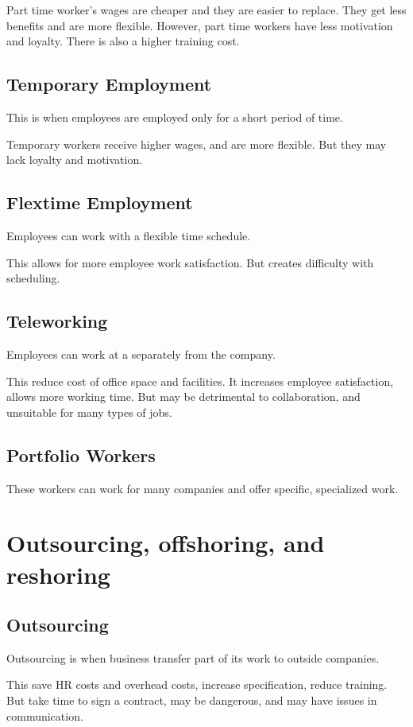 \documentclass{report}
\begin{document}
Part time worker's wages are cheaper and they are easier to replace.
They get less benefits and are more flexible.
However, part time workers have less motivation and loyalty.
There is also a higher training cost.

\subsection{Temporary Employment}
This is when employees are employed only for a short period of time.

Temporary workers receive higher wages, and are more flexible.
But they may lack loyalty and motivation.

\subsection{Flextime Employment}
Employees can work with a flexible time schedule.

This allows for more employee work satisfaction.
But creates difficulty with scheduling.

\subsection{Teleworking}
Employees can work at a separately from the company.

This reduce cost of office space and facilities.
It increases employee satisfaction, allows more working time.
But may be detrimental to collaboration, and unsuitable for many types of jobs.

\subsection{Portfolio Workers}
These workers can work for many companies and offer specific, specialized work.

\section{Outsourcing, offshoring, and reshoring}

\subsection{Outsourcing}
Outsourcing is when business transfer part of its work to outside companies.

This save HR costs and overhead costs, increase specification, reduce training.
But take time to sign a contract, may be dangerous, and may have issues in communication.
\end{document}
